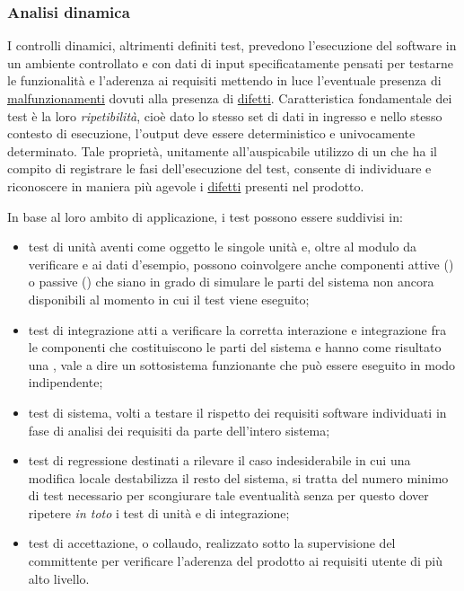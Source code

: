 {\subsubsection{Analisi dinamica}
I controlli dinamici, altrimenti definiti test, prevedono l'esecuzione del software in un ambiente controllato e con dati di input specificatamente pensati per testarne le funzionalità e l'aderenza ai requisiti mettendo in luce l'eventuale presenza di \underline{malfunzionamenti} dovuti alla presenza di \underline{difetti}. Caratteristica fondamentale dei test è la loro \emph{ripetibilità}, cioè dato lo stesso set di dati in ingresso e nello stesso contesto di esecuzione, l'output deve essere deterministico e univocamente determinato. Tale proprietà, unitamente all'auspicabile utilizzo di un  che ha il compito di registrare le fasi dell'esecuzione del test, consente di individuare e riconoscere in maniera più agevole i \underline{difetti} presenti nel prodotto.

In base al loro ambito di applicazione, i test possono essere suddivisi in:
\begin{itemize}
  \item test di unità aventi come oggetto le singole unità e, oltre al modulo da verificare e ai dati d'esempio, possono coinvolgere anche componenti attive () o passive () che siano in grado di simulare le parti del sistema non ancora disponibili al momento in cui il test viene eseguito;
  \item test di integrazione atti a verificare la corretta interazione e integrazione fra le componenti che costituiscono le parti del sistema e hanno come risultato una , vale a dire un sottosistema funzionante che può essere eseguito in modo indipendente;
  \item test di sistema, volti a testare il rispetto dei requisiti software individuati in fase di analisi dei requisiti da parte dell'intero sistema; 
  \item test di regressione destinati a rilevare il caso indesiderabile in cui una modifica locale destabilizza il resto del sistema, si tratta del numero minimo di test necessario per scongiurare tale eventualità senza per questo dover ripetere \emph{in toto} i test di unità e di integrazione;
  \item test di accettazione, o collaudo, realizzato sotto la supervisione del committente per verificare l'aderenza del prodotto ai requisiti utente di più alto livello.
\end{itemize}


}
